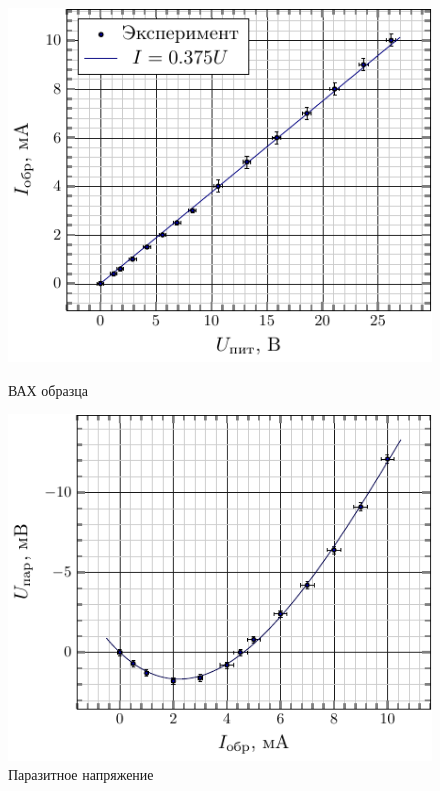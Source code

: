\documentclass[a4paper,14pt]{extarticle}
\begin{document}
\begin{figure}[h!]
\begin{minipage}[h]{0.49\linewidth}
	\centering
	\includegraphics[scale=1]{plot/current-voltage}
	\caption{ВАХ образца}
	\label{fig:5.2}
\end{minipage}
\hfill
\begin{minipage}[h]{0.49\linewidth}
	\centering
	\includegraphics[scale=1]{plot/current-excess_hall_voltage.pdf}
	\caption{Паразитное напряжение}
	\label{fig:5.3}
\end{minipage}
\end{figure}
\end{document}
